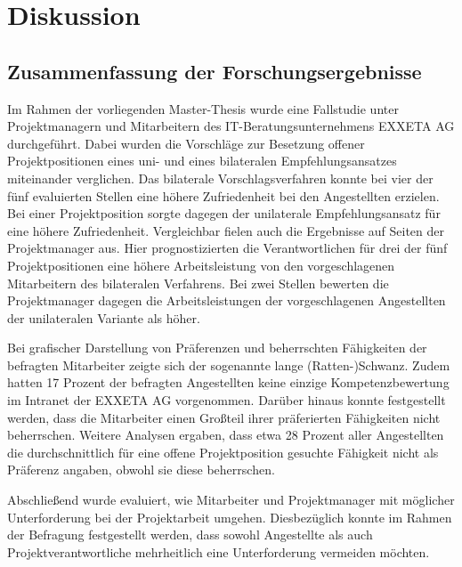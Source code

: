 \chapter{Diskussion}
\label{ch:diskussion}

\section{Zusammenfassung der Forschungsergebnisse}
\label{ch:diskussion:zusammenfassung}
Im Rahmen der vorliegenden Master-Thesis wurde eine Fallstudie unter Projektmanagern und Mitarbeitern des IT-Beratungsunternehmens EXXETA AG durchgeführt. Dabei wurden die Vorschläge zur Besetzung offener Projektpositionen eines uni- und eines bilateralen Empfehlungsansatzes miteinander verglichen. Das bilaterale Vorschlagsverfahren konnte bei vier der fünf evaluierten Stellen eine höhere Zufriedenheit bei den Angestellten erzielen. Bei einer Projektposition sorgte dagegen der unilaterale Empfehlungsansatz für eine höhere Zufriedenheit. Vergleichbar fielen auch die Ergebnisse auf Seiten der Projektmanager aus. Hier prognostizierten die Verantwortlichen für drei der fünf Projektpositionen eine höhere Arbeitsleistung von den vorgeschlagenen Mitarbeitern des bilateralen Verfahrens. Bei zwei Stellen bewerten die Projektmanager dagegen die Arbeitsleistungen der vorgeschlagenen Angestellten der unilateralen Variante als höher.

Bei grafischer Darstellung von Präferenzen und beherrschten Fähigkeiten der befragten Mitarbeiter zeigte sich der sogenannte lange (Ratten-)Schwanz. Zudem hatten 17 Prozent der befragten Angestellten keine einzige Kompetenzbewertung im Intranet der EXXETA AG vorgenommen. Darüber hinaus konnte festgestellt werden, dass die Mitarbeiter einen Großteil ihrer präferierten Fähigkeiten nicht beherrschen. Weitere Analysen ergaben, dass etwa 28 Prozent aller Angestellten die durchschnittlich für eine offene Projektposition gesuchte Fähigkeit nicht als Präferenz angaben, obwohl sie diese beherrschen. 

Abschließend wurde evaluiert, wie Mitarbeiter und Projektmanager mit möglicher Unterforderung bei der Projektarbeit umgehen. Diesbezüglich konnte im Rahmen der Befragung festgestellt werden, dass sowohl Angestellte als auch Projektverantwortliche mehrheitlich eine Unterforderung vermeiden möchten.
\newpage
